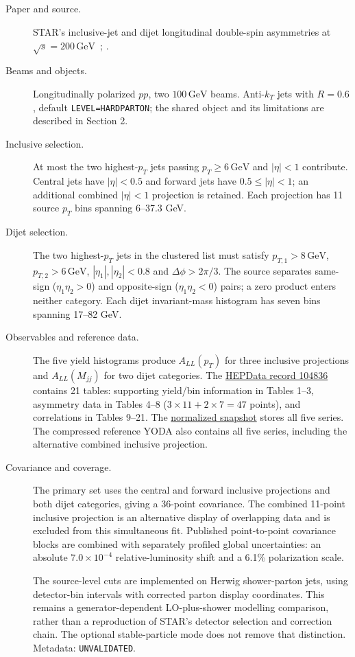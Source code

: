 \documentclass[11pt,a4paper]{article}
\newcommand{\GeV}{\mathrm{GeV}}
\newcommand{\id}[1]{{\small\texttt{\detokenize{#1}}}}
\newcommand{\sourcefile}[1]{\href{https://github.com/apapaefs/HerwigPolarizedPheno/blob/78d1be3962c3e058409634af28dc9cd52dc9b77d/analyses/rivet/pp/#1.cc}{\texttt{\detokenize{#1.cc}}}}
\newcommand{\repolink}[2]{\href{https://github.com/apapaefs/HerwigPolarizedPheno/blob/78d1be3962c3e058409634af28dc9cd52dc9b77d/#1}{#2}}
\begin{document}
\subsection{\texorpdfstring{\id{STAR_2021_I1850855}}{STAR 2021 I1850855}}
\begin{description}
\item[Paper and source.]
STAR's inclusive-jet and dijet longitudinal double-spin asymmetries at
$\sqrt{s}=200\,\GeV$~\cite{r1850855};
\sourcefile{STAR_2021_I1850855}.
\item[Beams and objects.]
Longitudinally polarized $pp$, two $100\,\GeV$ beams.
Anti-$k_T$ jets with $R=0.6$, default \texttt{LEVEL=HARDPARTON}; the shared
object and its limitations are described in Section 2.
\item[Inclusive selection.]
At most the two highest-$p_T$ jets passing $p_T\geq6\,\GeV$ and
$|\eta|<1$ contribute. Central jets have $|\eta|<0.5$ and forward jets
have $0.5\leq|\eta|<1$; an additional combined $|\eta|<1$ projection
is retained. Each projection has 11 source $p_T$ bins spanning 6--37.3 GeV.
\item[Dijet selection.]
The two highest-$p_T$ jets in the clustered list must satisfy
$p_{T,1}>8\,\GeV$, $p_{T,2}>6\,\GeV$,
$|\eta_1|,|\eta_2|<0.8$ and $\Delta\phi>2\pi/3$.
The source separates same-sign ($\eta_1\eta_2>0$) and opposite-sign
($\eta_1\eta_2<0$) pairs; a zero product enters neither category.
Each dijet invariant-mass histogram has seven bins spanning 17--82 GeV.
\item[Observables and reference data.]
The five yield histograms produce $A_{LL}(p_T)$ for three inclusive
projections and $A_{LL}(M_{jj})$ for two dijet categories. The
\href{https://doi.org/10.17182/hepdata.104836.v1}{HEPData record 104836}
contains 21 tables: supporting yield/bin information in Tables 1--3,
asymmetry data in Tables 4--8 ($3\times11+2\times7=47$ points), and
correlations in Tables 9--21. The
\repolink{data/phenomenology/STAR_2021_I1850855/reference.json}{normalized snapshot}
stores all five series. The compressed reference YODA also contains all five
series, including the alternative combined inclusive projection.
\item[Covariance and coverage.]
The primary set uses the central and forward inclusive projections and both
dijet categories, giving a 36-point covariance. The combined 11-point
inclusive projection is an alternative display of overlapping data and is
excluded from this simultaneous fit. Published point-to-point covariance
blocks are combined with separately profiled global uncertainties: an
absolute $7.0\times10^{-4}$ relative-luminosity shift and a 6.1\%
polarization scale.

The source-level cuts are implemented on Herwig shower-parton jets, using
detector-bin intervals with corrected parton display coordinates. This remains
a generator-dependent LO-plus-shower modelling comparison, rather than a
reproduction of STAR's detector selection and correction chain. The optional
stable-particle mode does not remove that distinction. Metadata:
\texttt{UNVALIDATED}.
\end{description}
\clearpage
\end{document}
